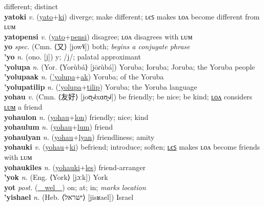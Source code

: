 different; distinct \label{yatolon} \\
\textbf{yatoki} \textit{v.} (\hyperref[yato]{yato}+\hyperref[ki]{ki})
diverge; make different; ʟєꜱ makes ʟᴏᴧ become different from ʟᴜᴍ \label{yatoki} \\
\textbf{yatopensi} \textit{v.} (\hyperref[yato]{yato}+\hyperref[pensi]{pensi})
disagree; ʟᴏᴧ disagrees with ʟᴜᴍ \label{yatopensi} \\
\textbf{yo} \textit{spec.} (Cmn. ⟨又⟩ [jow˥˩])
both; \textit{begins a conjugate phrase} \label{yo} \\
\textbf{'yo} \textit{n.} (ono. [j])
y; /j/; palatal approximant \label{'yo} \\
\textbf{'yolupa} \textit{n.} (Yor. ⟨Yorùbá⟩ [jōɾùbá])
Yoruba; Ioruba; Joruba; the Yoruba people \label{'yolupa} \\
\textbf{'yolupaak} \textit{n.} (\hyperref['yolupa]{'yolupa}+\hyperref[ak]{ak})
Yoruba; of the Yoruba \label{'yolupaak} \\
\textbf{'yolupatilip} \textit{n.} (\hyperref['yolupa]{'yolupa}+\hyperref[tilip]{tilip})
Yoruba; the Yoruba language \label{'yolupatilip} \\
\textbf{yohau} \textit{v.} (Cmn. ⟨友好⟩ [joʊ̯˧˩˧xɑʊ̯˧˩˧])
be friendly; be nice; be kind; \hyperref[yohaulon]{ʟᴏᴧ} considers \hyperref[yohaulum]{ʟᴜᴍ} a friend \label{yohau} \\
\textbf{yohaulon} \textit{n.} (\hyperref[yohau]{yohau}+\hyperref[lon]{lon})
friendly; nice; kind \label{yohaulon} \\
\textbf{yohaulum} \textit{n.} (\hyperref[yohau]{yohau}+\hyperref[lum]{lum})
friend \label{yohaulum} \\
\textbf{yohaulyan} \textit{n.} (\hyperref[yohau]{yohau}+\hyperref[lyan]{lyan})
friendliness; amity \label{yohaulyan} \\
\textbf{yohauki} \textit{v.} (\hyperref[yohau]{yohau}+\hyperref[ki]{ki})
befriend; introduce; soften; \hyperref[yohaukiles]{ʟєꜱ} makes ʟᴏᴧ become friends with ʟᴜᴍ \label{yohauki} \\
\textbf{yohaukiles} \textit{n.} (\hyperref[yohauki]{yohauki}+\hyperref[les]{les})
friend-arranger \label{yohaukiles} \\
\textbf{'yok} \textit{n.} (Eng. ⟨York⟩ [jɔːk])
York \label{'yok} \\
\textbf{yot} \textit{post.} (\hyperref[wel]{~~wel~~})
on; at; in; \textit{marks location} \label{yot} \\
\textbf{'yishael} \textit{n.} (Heb. ⟨ישראל⟩ [jisʁael])
Israel \label{'yishael} \\
